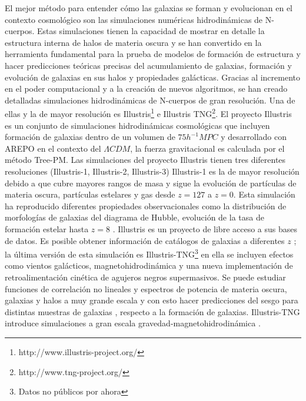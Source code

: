 \documentclass{bmcart}
\begin{document}
El mejor método para entender cómo las galaxias se forman y evolucionan en el 
contexto cosmológico son las simulaciones numéricas hidrodinámicas de 
N-cuerpos. Estas simulaciones tienen la capacidad de mostrar en detalle la 
estructura interna de halos de materia oscura  y se han convertido en la 
herramienta fundamental para la prueba de modelos de formación de estructura y 
hacer predicciones teóricas precisas del acumulamiento de galaxias, formación y 
evolución de galaxias en sus halos y propiedades galácticas. Gracias al 
incremento en el poder computacional y a la creación de nuevos algoritmos, se 
han creado detalladas simulaciones hidrodinámicas de N-cuerpos de gran 
resolución. Una de ellas y la de mayor resolución es 
Illustris\footnote{http://www.illustris-project.org/} e Illustris 
TNG\footnote{http://www.tng-project.org/}. El proyecto Illustris es un conjunto 
de simulaciones hidrodinámicas cosmológicas que incluyen formación de galaxias 
\cite{2014MNRAS.444.1518V} dentro de un volumen de $75h^{-1}MPC$ y desarrollado 
con AREPO \cite{2010MNRAS.401..791S} en el contexto del $\Lambda CDM$, la 
fuerza gravitacional es calculada por el método Tree-PM. Las simulaciones del 
proyecto Illustris tienen tres diferentes resoluciones (Illustris-1, 
Illustris-2, Illustris-3) Illustris-1 es la de mayor resolución debido a que 
cubre mayores rangos de masa y sigue la evolución de partículas de materia 
oscura, partículas estelares y gas desde $z=127$ a $z=0$. Esta simulación ha 
reproducido diferentes propiedades observacionales como la distribución de 
morfologías de galaxias del diagrama de Hubble, evolución de la tasa de 
formación estelar hasta $z=8$ \cite{2014MNRAS.445..175G}. Illustris es un 
proyecto de libre acceso a sus bases de datos. Es posible obtener información 
de catálogos de galaxias a diferentes $z$ \cite{2015A&C....13...12N}; la última 
versión de esta simulación es Illustris-TNG\footnote{Datos no públicos por 
ahora} en ella se incluyen efectos como vientos galácticos, 
magnetohidrodinámica y una nueva implementación de retroalimentación cinética 
de agujeros negros supermasivos. Se puede estudiar funciones de correlación no 
lineales y espectros de potencia de materia oscura, galaxias y halos a muy 
grande escala y con esto hacer predicciones del sesgo para distintas muestras 
de galaxias \cite{2018MNRAS.475..676S}, respecto a la formación de galaxias. 
Illustris-TNG introduce simulaciones a gran escala 
gravedad-magnetohidrodinámica \cite{2018MNRAS.473.4077P}.  
\end{document}
